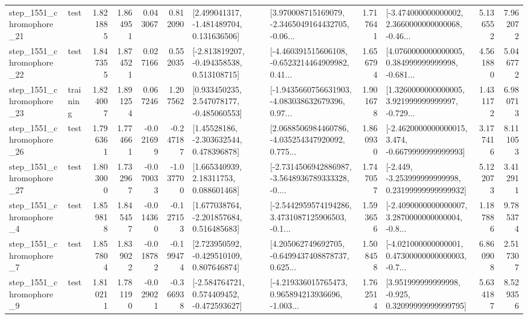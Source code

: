 \begin{tabular}{llrrrrllrlrr}
 step\_1551\_chromophore\_21 &      test &      1.821885 &    1.864951 &      0.043067 &  0.812090 &    [2.499041317, -1.481489704, 0.131636506] &  [3.970008715169079, -2.3465049164432705, -0.06... &       1.717641 &  [-3.474000000000002, 2.3660000000000068, -0.46... &            5.136552 &          7.962072 \\
 step\_1551\_chromophore\_22 &      test &      1.847355 &    1.874521 &      0.027166 &  0.552035 &   [-2.813819207, -0.494358538, 0.513108715] &  [-4.460391515606108, -0.6523214464909982, 0.41... &       1.656794 &  [4.0760000000000005, 0.384999999999998, -0.681... &            4.561880 &          5.046772 \\
 step\_1551\_chromophore\_23 &  training &      1.824007 &    1.891254 &      0.067246 &  1.207562 &    [0.933450235, 2.547078177, -0.485060553] &  [-1.9435660756631903, -4.083038632679396, 0.97... &       1.901678 &  [1.3260000000000005, 3.921999999999997, -0.729... &            1.431172 &          6.980713 \\
 step\_1551\_chromophore\_26 &      test &      1.796361 &    1.774661 &     -0.021699 & -0.247187 &     [1.45528186, -2.303632544, 0.478396878] &  [2.0688506984460786, -4.035254347920092, 0.775... &       1.860930 &  [-2.4620000000000015, 3.474, -0.6679999999999993] &            3.177416 &          8.111053 \\
 step\_1551\_chromophore\_27 &      test &      1.803000 &    1.732967 &     -0.070033 & -1.037700 &      [1.665340939, 2.18311753, 0.088601468] &  [-2.7314506942886987, -3.5648936789333328, -0.... &       1.747057 &  [-2.449, -3.253999999999998, 0.23199999999999932] &            5.122073 &          3.412911 \\
  step\_1551\_chromophore\_4 &      test &      1.859818 &    1.845457 &     -0.014360 & -0.127153 &    [1.677038764, -2.201857684, 0.516485683] &  [-2.5442959574194286, 3.4731087125906503, -0.1... &       1.593656 &  [-2.4090000000000007, 3.2870000000000004, -0.8... &            1.187886 &          9.785374 \\
  step\_1551\_chromophore\_7 &      test &      1.857804 &    1.839022 &     -0.018782 & -0.199474 &    [2.723950592, -0.429510109, 0.807646874] &  [4.205062749692705, -0.6499437408878737, 0.625... &       1.508458 &  [-4.021000000000001, 0.47300000000000003, -0.7... &            6.860908 &          2.517307 \\
  step\_1551\_chromophore\_9 &      test &      1.810211 &    1.781190 &     -0.029021 & -0.366938 &   [-2.584764721, 0.574409452, -0.472593627] &  [-4.219336015765473, 0.965894213936696, -1.003... &       1.762514 &   [3.951999999999998, -0.925, 0.32099999999999795] &            5.634187 &          8.529356 \\

\end{tabular}
